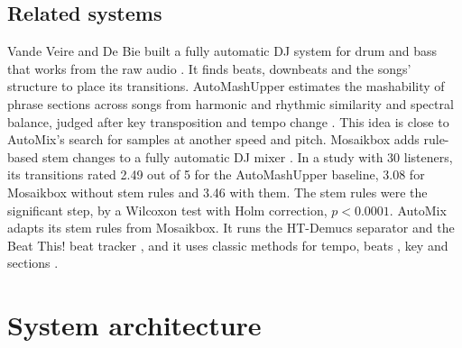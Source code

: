 \documentclass[conference,a4paper]{IEEEtran}
\newcommand{\q}[1]{\textquotedbl{}#1\textquotedbl{}}
\begin{document}
\subsection{Related systems}
Vande Veire and De Bie built a fully automatic DJ system for drum and bass that works from the raw
audio \cite{vandeveire2018}. It finds beats, downbeats and the songs' structure to place its
transitions. AutoMashUpper estimates the \q{mashability} of phrase sections across songs from
harmonic and rhythmic similarity and spectral balance, judged after key transposition and tempo
change \cite{davies2014}. This idea is close to AutoMix's search for samples at another speed and
pitch. Mosaikbox adds rule-based stem changes to a fully automatic DJ mixer \cite{mosaikbox}. In a
study with 30 listeners, its transitions rated 2.49 out of 5 for the AutoMashUpper baseline, 3.08
for Mosaikbox without stem rules and 3.46 with them. The stem rules were the significant step, by
a Wilcoxon test with Holm correction, $p<0.0001$. AutoMix adapts its stem rules from Mosaikbox. It
runs the HT-Demucs separator \cite{htdemucs} and the Beat This! beat tracker \cite{beatthis}, and it
uses classic methods for tempo, beats \cite{ellis2007}, key \cite{krumhansl1982} and sections
\cite{foote2000}.

\section{System architecture}\label{sec:architecture}
\end{document}
